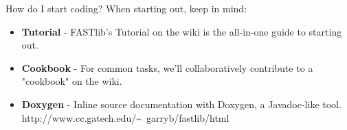 \documentclass[pdf,colorBG,slideColor]{prosper}
\newcommand{\itemt}[1]{\item {\bf #1} -}
\begin{document}
%

\begin{slide}{How do I start coding?}
 \vspace*{.3in}
 When starting out, keep in mind: \\
 \begin{itemize}
 \itemt{Tutorial} FASTlib's Tutorial on the wiki is the all-in-one guide to starting out.
 \itemt{Cookbook}
 For common tasks, we'll collaboratively contribute to a "cookbook" on the wiki.
 \itemt{Doxygen}
 Inline source documentation with Doxygen, a Javadoc-like tool.
 http://www.cc.gatech.edu/\~~garryb/fastlib/html
 \end{itemize}
\end{slide}
\end{document}
